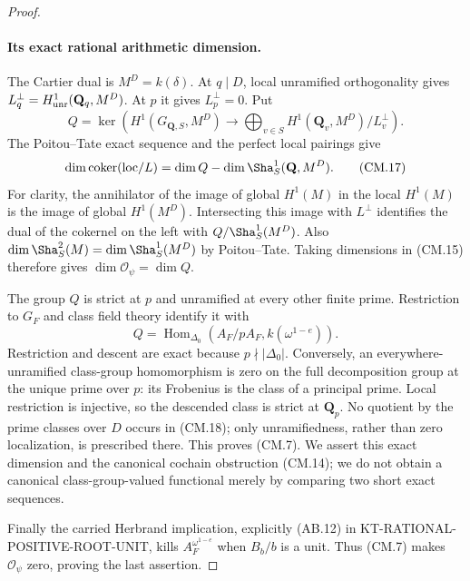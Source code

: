 \begin{proof}
\paragraph{Its exact rational arithmetic dimension.}
The Cartier dual is $M^D=k(\delta)$.
At $q\mid D$, local unramified orthogonality gives
$L_q^\perp=H^1_{\rm unr}(\mathbf Q_q,M^D)$.
At $p$ it gives $L_p^\perp=0$.
Put
\[
 Q=\ker\!\left(H^1(G_{\mathbf Q,S},M^D)
       \longrightarrow\bigoplus_{v\in S}
                   H^1(\mathbf Q_v,M^D)/L_v^\perp\right).
                                                               \tag{CM.16}
\]
The Poitou--Tate exact sequence and the perfect local
pairings give
\[
 \dim\operatorname{coker}(\mathrm{loc}/L)
       =\dim Q-\dim\Sha^1_S(\mathbf Q,M^D).
                                                               \tag{CM.17}
\]
For clarity, the annihilator of the image of global
$H^1(M)$ in the local $H^1(M)$ is the image of global
$H^1(M^D)$.  Intersecting this image with $L^\perp$
identifies the dual of the cokernel on the left with
$Q/\Sha^1_S(M^D)$.  Also
$\dim\Sha^2_S(M)=\dim\Sha^1_S(M^D)$ by Poitou--Tate.
Taking dimensions in (CM.15) therefore gives
$\dim\mathcal O_\psi=\dim Q$.

The group $Q$ is strict at $p$ and unramified at every
other finite prime.  Restriction to $G_F$ and class field
theory identify it with
\[
              Q=\operatorname{Hom}_{\Delta_0}
                          (A_F/pA_F,k(\omega^{1-e})).           \tag{CM.18}
\]
Restriction and descent are exact because $p\nmid|\Delta_0|$.
Conversely, an everywhere-unramified class-group homomorphism
is zero on the full decomposition group at the unique prime
over $p$: its Frobenius is the class of a principal prime.
Local restriction is injective, so the descended class is
strict at $\mathbf Q_p$.  No quotient by the prime classes
over $D$ occurs in (CM.18); only unramifiedness, rather
than zero localization, is prescribed there.
This proves (CM.7).  We assert this exact dimension and the
canonical cochain obstruction (CM.14); we do not obtain a
canonical class-group-valued functional merely by comparing
two short exact sequences.

Finally the carried Herbrand implication, explicitly (AB.12)
in KT-RATIONAL-POSITIVE-ROOT-UNIT, kills
$A_F^{\omega^{1-e}}$ when $B_b/b$ is a unit.
Thus (CM.7) makes $\mathcal O_\psi$ zero, proving the last
assertion.
\end{proof}

